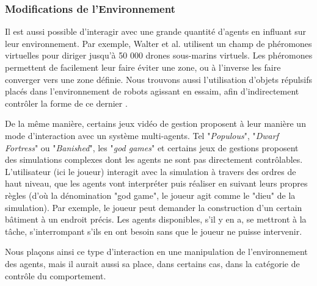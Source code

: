 		
		
	\subsubsection{Modifications de l'Environnement}
		Il est aussi possible d'interagir avec une grande quantité d'agents en influant sur leur environnement. Par exemple, Walter et al. \cite{walter_uav_2006} utilisent un champ de phéromones virtuelles pour diriger jusqu'à 50 000 drones sous-marins virtuels. Les phéromones permettent de facilement leur faire éviter une zone, ou à l'inverse les faire converger vers une zone définie. Nous trouvons aussi l'utilisation d'objets répulsifs placés dans l'environnement de robots agissant en essaim, afin d'indirectement contrôler la forme de ce dernier \cite{jung_multi-robot_2013}.	
	
		De la même manière, certains jeux vidéo de gestion proposent à leur manière un mode d'interaction avec un système multi-agents. Tel "\textit{Populous}", "\textit{Dwarf Fortress}" ou "\textit{Banished}", les "\textit{god games}" et certains jeux de gestions proposent des simulations complexes dont les agents ne sont pas directement contrôlables. L'utilisateur (ici le joueur) interagit avec la simulation à travers des ordres de haut niveau, que les agents vont interpréter puis réaliser en suivant leurs propres règles (d'où la dénomination "god game", le joueur agit comme le "dieu" de la simulation). Par exemple, le joueur peut demander la construction d'un certain bâtiment à un endroit précis. Les agents disponibles, s'il y en a, se mettront à la tâche, s'interrompant s'ils en ont besoin sans que le joueur ne puisse intervenir. 
		
		Nous plaçons ainsi ce type d'interaction en une manipulation de l'environnement des agents, mais il aurait aussi sa place, dans certains cas, dans la catégorie de contrôle du comportement.
	
